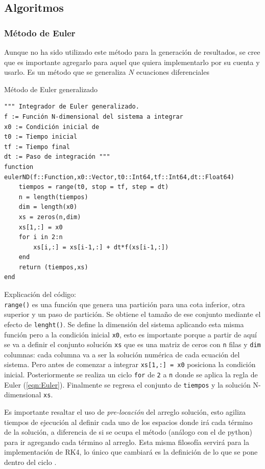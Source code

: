 \subsection{Algoritmos}\label{sec:algoritmos}

\subsubsection{Método de Euler}

Aunque no ha sido utilizado este método para la generación de resultados, se cree que es importante agregarlo para aquel que quiera implementarlo por su cuenta y usarlo. Es un método que se generaliza $N$ ecuaciones diferenciales
\begin{algorithm}
	\caption{Método de Euler generalizado}
	\label{al:Euler}
	\begin{verbatim}
""" Integrador de Euler generalizado.
f := Función N-dimensional del sistema a integrar
x0 := Condición inicial de
t0 := Tiempo inicial
tf := Tiempo final
dt := Paso de integración """
function eulerND(f::Function,x0::Vector,t0::Int64,tf::Int64,dt::Float64)          
	tiempos = range(t0, stop = tf, step = dt)
	n = length(tiempos)                      
	dim = length(x0)                         
	xs = zeros(n,dim)                        
	xs[1,:] = x0                             
	for i in 2:n 
		xs[i,:] = xs[i-1,:] + dt*f(xs[i-1,:])
	end
	return (tiempos,xs)
end
	\end{verbatim}
	Explicación del código:\\
	\texttt{range()} es una función que genera una partición para una cota inferior, otra superior y un paso de partición. Se obtiene el tamaño de ese conjunto mediante el efecto de \texttt{lenght()}. Se define la dimensión del sistema aplicando esta misma función pero a la condición inicial \texttt{x0}, esto es importante porque a partir de aquí se va a definir el conjunto solución \texttt{xs} que es una matriz de ceros con \texttt{n} filas y \texttt{dim} columnas: cada columna va a ser la solución numérica de cada ecuación del sistema. Pero antes de comenzar a integrar \texttt{xs[1,:] = x0} posiciona la condición inicial. Posteriormente se realiza un ciclo \texttt{for} de \texttt{2} a \texttt{n} donde se aplica la regla de Euler (\ref{eqn:Euler}). Finalmente se regresa el conjunto de \texttt{tiempos} y la solución N-dimensional \texttt{xs}.
\end{algorithm}
\newpage
Es importante resaltar el uso de \textit{pre-locación} del arreglo solución, esto agiliza tiempos de ejecución al definir cada uno de los espacios donde irá cada término de la solución, a diferencia de si se ocupa el método  (análogo con el  de python) para ir agregando cada término al arreglo. Esta misma filosofía servirá para la implementación de RK4, lo único que cambiará es la definición de lo que se pone dentro del ciclo .
